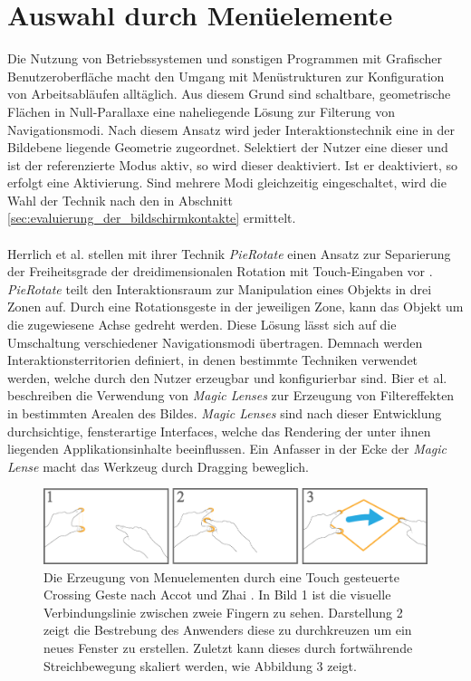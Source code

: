 \section{Auswahl durch Menüelemente}
\label{sec:menu_elemente}

Die Nutzung von Betriebssystemen und sonstigen Programmen mit Grafischer Benutzeroberfläche macht den Umgang mit Menüstrukturen zur Konfiguration von Arbeitsabläufen alltäglich. Aus diesem Grund sind schaltbare, geometrische Flächen in Null-Parallaxe eine naheliegende Lösung zur Filterung von Navigationsmodi. Nach diesem Ansatz wird jeder Interaktionstechnik eine in der Bildebene liegende Geometrie zugeordnet. Selektiert der Nutzer eine dieser und ist der referenzierte Modus aktiv, so wird dieser deaktiviert. Ist er deaktiviert, so erfolgt eine Aktivierung. Sind mehrere Modi gleichzeitig eingeschaltet, wird die Wahl der Technik nach den in Abschnitt \ref{sec:evaluierung_der_bildschirmkontakte} ermittelt.   
\\\\
Herrlich et al. stellen mit ihrer Technik \emph{PieRotate} einen Ansatz zur Separierung der Freiheitsgrade der dreidimensionalen Rotation mit Touch-Eingaben vor \cite{herrlich:2011}. \emph{PieRotate} teilt den Interaktionsraum zur Manipulation eines Objekts in drei Zonen auf. Durch eine Rotationsgeste in der jeweiligen Zone, kann das Objekt um die zugewiesene Achse gedreht werden. Diese Lösung lässt sich auf die Umschaltung verschiedener Navigationsmodi übertragen. Demnach werden Interaktionsterritorien definiert, in denen bestimmte Techniken verwendet werden, welche durch den Nutzer erzeugbar und konfigurierbar sind. Bier et al. beschreiben die Verwendung von \emph{Magic Lenses} zur Erzeugung von Filtereffekten in bestimmten Arealen des Bildes. \emph{Magic Lenses} sind nach dieser Entwicklung durchsichtige, fensterartige Interfaces, welche das Rendering der unter ihnen liegenden Applikationsinhalte beeinflussen. Ein Anfasser in der Ecke der \emph{Magic Lense} macht das Werkzeug durch Dragging beweglich.

\begin{figure}
	\begin{center}
		\includegraphics[width=12cm]{img/menu_geste.pdf}
	\end{center}
	\caption{Die Erzeugung von Menuelementen durch eine Touch gesteuerte Crossing Geste nach Accot und Zhai \cite{accot:2002}. In Bild 1 ist die visuelle Verbindungslinie zwischen zweie Fingern zu sehen. Darstellung 2 zeigt die Bestrebung des Anwenders diese zu durchkreuzen um ein neues Fenster zu erstellen. Zuletzt kann dieses durch fortwährende Streichbewegung skaliert werden, wie Abbildung 3 zeigt.}
	\label{fig:menu_geste}
\end{figure}

